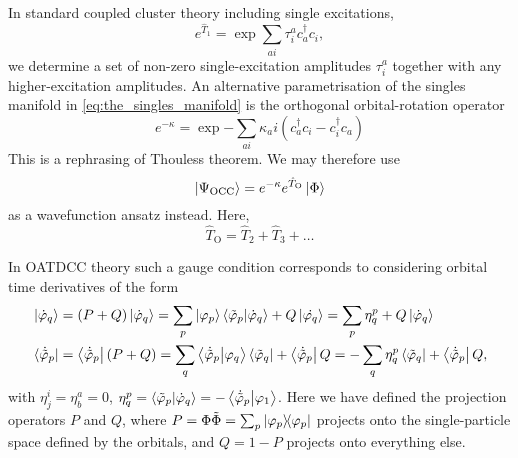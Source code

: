 \begin{tcolorbox}[title={Orbital-optimised and Bruecker coupled cluster theories
    \cite{krylov1998size,pedersen1999gauge}}, 
    colback={white},
    colbacktitle={pink},
    coltitle={black}]

    In standard coupled cluster theory including single excitations,
    \begin{equation}
        \label{eq:the_singles_manifold}
        e^{\hat{T}_1} = \exp{\sum_{ai}\tau^a_ic^\dagger_ac_i},
    \end{equation} 
    we determine a set of non-zero single-excitation amplitudes $\tau^a_i$
    together with any 
    higher-excitation amplitudes.
    An alternative parametrisation of the singles manifold
    in \autoref{eq:the_singles_manifold} is the orthogonal orbital-rotation 
    operator
    \begin{equation}
        \label{eq:the_orbital rotator}
        e^{-\kappa} = \exp{ 
            - \sum_{ai} \kappa_ai(c^\dagger_a c_i - c^\dagger_i c_a)     
        }
    \end{equation}
    This is a rephrasing of Thouless
    theorem\cite{thouless1960stability}. We may therefore use 
    \begin{equation}
       \ket{\Psi_{\text{OCC}}} = e^{-\kappa}e^{\hat{T}_{\text{O}}}\ket{\Phi}
    \end{equation}
    as a wavefunction ansatz instead. Here,
    \begin{equation}
        \hat{T}_{\text{O}} = \hat{T}_2 + \hat{T}_3 + \dots
    \end{equation}

\end{tcolorbox}

In OATDCC theory such a gauge condition corresponds to considering orbital time 
derivatives of the form
\begin{align}
    \label{eq:orbital_time_derivative_ket}
    \ket{\dot{\varphi}_q} &= (P + Q)\ket{\dot{\varphi}_q}
        = \sum_p \ket{\varphi_p}\braket{\tilde{\varphi}_p}{\dot{\varphi}_q} 
            + Q\ket{\dot{\varphi_q}}
        = \sum_p\eta^p_q + Q\ket{\dot{\varphi}_q}\\
    \label{eq:orbital_time_derivative_bra}
    \bra*{\dot{\tilde{\varphi}}_p} &= \bra{\dot{\tilde{\varphi}}_p}(P + Q)
        = \sum_q \braket{\dot{\tilde{\varphi}}_p}{\varphi_q}\bra{\tilde{\varphi}_q}
            + \bra{\dot{\tilde{\varphi}}_p}Q
        = - \sum_q \eta^p_q \bra{\tilde{\varphi}_q} + \bra{\dot{\tilde{\varphi}}_p}Q,
\end{align}
with $\eta^i_j = \eta^a_b = 0$,
$\eta^p_q = \braket{\tilde{\varphi}_p}{\dot{\varphi}_q} = - \braket{\dot{\tilde{\varphi}}_p}{\varphi_1}$.
Here we have defined the projection operators $P$ and $Q$, where 
$P = \Phi\tilde{\Phi} = \sum_p \dyad{\varphi_p}{\varphi_p}$ projects onto the single-particle 
space defined by the orbitals, and $Q = 1 - P$ projects onto everything else.

